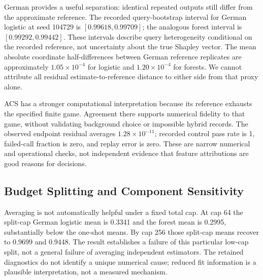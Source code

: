 \documentclass{article}
\begin{document}
German provides a useful separation: identical repeated outputs still differ from the approximate reference. The recorded query-bootstrap interval for German logistic at seed 104729 is $[0.99618,0.99709]$; the analogous forest interval is $[0.99292,0.99442]$. These intervals describe query heterogeneity conditional on the recorded reference, not uncertainty about the true Shapley vector. The mean absolute coordinate half-differences between German reference replicates are approximately $1.05\times10^{-4}$ for logistic and $1.20\times10^{-4}$ for forests. We cannot attribute all residual estimate-to-reference distance to either side from that proxy alone.

ACS has a stronger computational interpretation because its reference exhausts the specified finite game. Agreement there supports numerical fidelity to that game, without validating background choice or impossible hybrid records. The observed endpoint residual averages $1.28\times10^{-11}$; recorded control pass rate is 1, failed-call fraction is zero, and replay error is zero. These are narrow numerical and operational checks, not independent evidence that feature attributions are good reasons for decisions.

\subsection{Budget Splitting and Component Sensitivity}
Averaging is not automatically helpful under a fixed total cap. At cap 64 the split-cap German logistic mean is 0.3341 and the forest mean is 0.2995, substantially below the one-shot means. By cap 256 those split-cap means recover to 0.9699 and 0.9448. The result establishes a failure of this particular low-cap split, not a general failure of averaging independent estimators. The retained diagnostics do not identify a unique numerical cause; reduced fit information is a plausible interpretation, not a measured mechanism.
\end{document}
